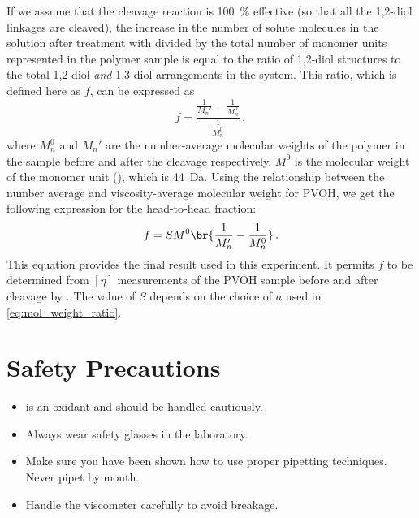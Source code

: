 \documentclass[nobib,nofonts,nols,nohyper]{tufte-handout}
\begin{document}
If we assume that the cleavage reaction is \SI{100}{\percent} effective (so that all the 1,2-diol linkages are cleaved), the increase in the number of solute molecules in the solution after treatment with  divided by the total number of monomer units represented in the polymer sample is equal to the ratio of 1,2-diol structures to the total 1,2-diol \emph{and} 1,3-diol arrangements in the system. 
This ratio, which is defined here as \( f \), can be expressed as
\begin{equation}
	f = \frac{\frac{1}{M_n'} - \frac{1}{M_n^0}}{\frac{1}{M_n^0}} \, ,
	\label{eq:frac_glycol}
\end{equation}
where \( M_n^0 \) and \( M_n' \) are the number-average molecular weights of the polymer in the sample before
and after the  cleavage respectively. 
\( M^0 \) is the molecular weight of the monomer unit (), which is \SI{44}{\dalton}. 
Using the relationship between the number average and viscosity-average molecular weight for PVOH, we get the following expression for the head-to-head fraction:
\begin{equation}
	f = S M^0 \br{\frac{1}{M_n'} - \frac{1}{M_n^0}}\, .
	\label{eq:h2h_frac}
\end{equation}
This equation provides the final result used in this experiment. 
It permits \( f \) to be determined from \( [\eta] \) measurements of the PVOH sample before and after cleavage by . The value of \( S \) depends on the choice of \( a \) used in \cref{eq:mol_weight_ratio}.



\pagebreak

\section{Safety Precautions} %
\label{sec:safety}

\begin{itemize}
	\item {} is an oxidant and should be handled cautiously. 
	\item Always wear safety glasses in the laboratory.
	\item Make sure you have been shown how to use proper pipetting techniques. 
	Never pipet by mouth.
	\item Handle the viscometer carefully to avoid breakage. 
\end{itemize}
\end{document}
